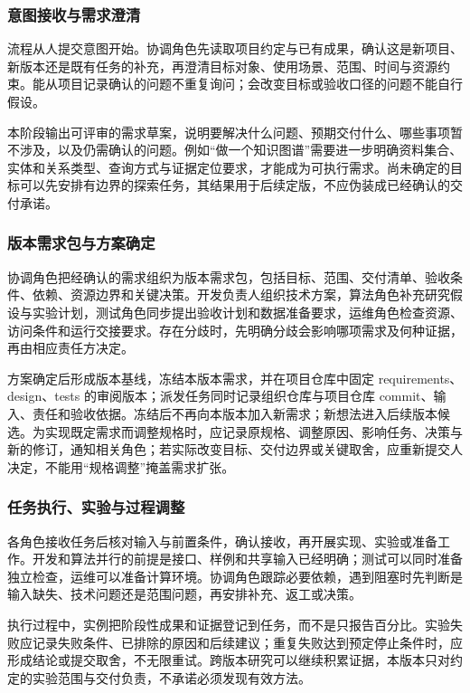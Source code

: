 \documentclass[11pt,a4paper]{article}
\begin{document}
\subsubsection{意图接收与需求澄清}

流程从人提交意图开始。协调角色先读取项目约定与已有成果，确认这是新项目、新版本还是既有任务的补充，再澄清目标对象、使用场景、范围、时间与资源约束。能从项目记录确认的问题不重复询问；会改变目标或验收口径的问题不能自行假设。

本阶段输出可评审的需求草案，说明要解决什么问题、预期交付什么、哪些事项暂不涉及，以及仍需确认的问题。例如“做一个知识图谱”需要进一步明确资料集合、实体和关系类型、查询方式与证据定位要求，才能成为可执行需求。尚未确定的目标可以先安排有边界的探索任务，其结果用于后续定版，不应伪装成已经确认的交付承诺。

\subsubsection{版本需求包与方案确定}

协调角色把经确认的需求组织为版本需求包，包括目标、范围、交付清单、验收条件、依赖、资源边界和关键决策。开发负责人组织技术方案，算法角色补充研究假设与实验计划，测试角色同步提出验收计划和数据准备要求，运维角色检查资源、访问条件和运行交接要求。存在分歧时，先明确分歧会影响哪项需求及何种证据，再由相应责任方决定。

方案确定后形成版本基线，冻结本版本需求，并在项目仓库中固定 requirements、design、tests 的审阅版本；派发任务同时记录组织仓库与项目仓库 commit、输入、责任和验收依据。冻结后不再向本版本加入新需求；新想法进入后续版本候选。为实现既定需求而调整规格时，应记录原规格、调整原因、影响任务、决策与新的修订，通知相关角色；若实际改变目标、交付边界或关键取舍，应重新提交人决定，不能用“规格调整”掩盖需求扩张。

\subsubsection{任务执行、实验与过程调整}

各角色接收任务后核对输入与前置条件，确认接收，再开展实现、实验或准备工作。开发和算法并行的前提是接口、样例和共享输入已经明确；测试可以同时准备独立检查，运维可以准备计算环境。协调角色跟踪必要依赖，遇到阻塞时先判断是输入缺失、技术问题还是范围问题，再安排补充、返工或决策。

执行过程中，实例把阶段性成果和证据登记到任务，而不是只报告百分比。实验失败应记录失败条件、已排除的原因和后续建议；重复失败达到预定停止条件时，应形成结论或提交取舍，不无限重试。跨版本研究可以继续积累证据，本版本只对约定的实验范围与交付负责，不承诺必须发现有效方法。
\end{document}
